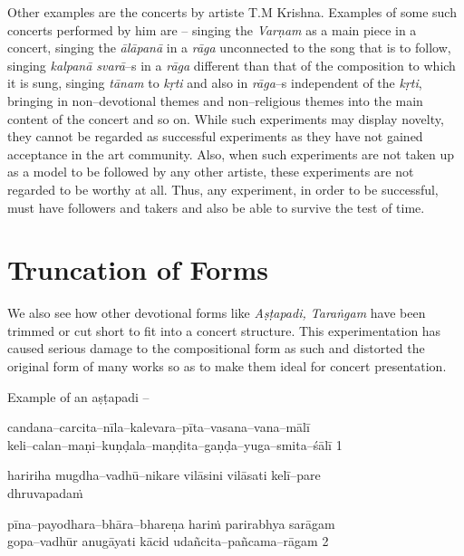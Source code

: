 Other examples are the concerts by artiste T.M Krishna. Examples of some such concerts performed by him are – singing the \textit{Varṇam} as a main piece in a concert, singing the \textit{ālāpanā} in a \textit{rāga} unconnected to the song that is to follow, singing \textit{kalpanā svarā}–s in a \textit{rāga} different than that of the composition to which it is sung, singing \textit{tānam} to \textit{kṛti} and also in \textit{rāga}–s independent of the \textit{kṛti}, bringing in non–devotional themes and non–religious themes into the main content of the concert and so on. While such experiments may display novelty, they cannot be regarded as successful experiments as they have not gained acceptance in the art community. Also, when such experiments are not taken up as a model to be followed by any other artiste, these experiments are not regarded to be worthy at all. Thus, any experiment, in order to be successful, must have followers and takers and also be able to survive the test of time.


\section*{Truncation of Forms}

We also see how other devotional forms like \textit{Aṣṭapadi, Taraṅgam} have been trimmed or cut short to fit into a concert structure. This experimentation has caused serious damage to the compositional form as such and distorted the original form of many works so as to make them ideal for concert presentation.

Example of an aṣṭapadi –

\begin{myquote}
candana–carcita–nīla–kalevara–pīta–vasana–vana–mālī \\ keli–calan–maṇi–kuṇḍala–maṇḍita–gaṇḍa–yuga–smita–śālī 1 
\end{myquote}

\begin{myquote}
haririha mugdha–vadhū–nikare vilāsini vilāsati kelī–pare \\ dhruvapadaṁ 
\end{myquote}

\begin{myquote}
pīna–payodhara–bhāra–bhareṇa hariṁ parirabhya sarāgam \\ gopa–vadhūr anugāyati kācid udañcita–pañcama–rāgam  2 
\end{myquote}

